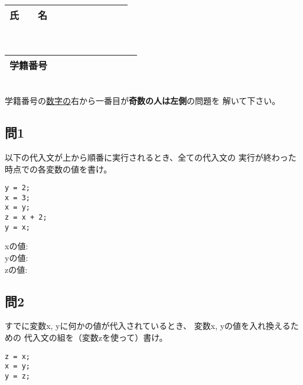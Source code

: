 \documentclass[a4j]{jarticle}
\def\ds{\displaystyle}
\begin{document}
\thispagestyle{empty}

\begin{multicols*}{2}%


\def\subst#1#2{$\ds #1$
 \ $\longrightarrow$\ 
 \underline{\hbox to 5cm{\ttfamily #2}}}



\noindent
\begin{tabular}[t]{|c|cccccccc|}\hline
氏　　名 & & & & & & & & \\ \hline
\end{tabular}\\
\begin{tabular}[t]{|c|c|c|c|c|c|c|c|c|c|}\hline
学籍番号 & & & & & & & & \\ \hline
\end{tabular}\\
学籍番号の\underline{数字の}右から一番目が{\bfseries 奇数の人は左側}の問題を
解いて下さい。
\vspace{-5ex}


\subsection*{問1}

以下の代入文が上から順番に実行されるとき、全ての代入文の
実行が終わった時点での各変数の値を書け。

\begin{verbatim}
y = 2;
x = 3;
x = y;
z = x + 2;
y = x;
\end{verbatim}


{\ttfamily x}の値:\\

{\ttfamily y}の値:\\

{\ttfamily z}の値:\\


\subsection*{問2}

すでに変数{\ttfamily x, y}に何かの値が代入されているとき、
変数{\ttfamily x, y}の値を入れ換えるための
代入文の組を（変数{\ttfamily z}を使って）書け。




\ifnum {}
\vspace*{2cm}
\else
\begin{verbatim}
z = x;
x = y;
y = z;
\end{verbatim}%
\fi



\end{multicols*}
\end{document}
